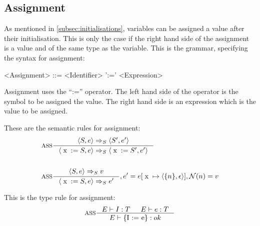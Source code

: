 \subsection{Assignment}\label{subsec:assignment}
As mentioned in \cref{subsec:initialisations}, variables can be assigned a value after their initialisation. This is only the case if the right hand side of the assignment is a value and of the same type as the variable.
This is the grammar, specifying the syntax for assignment:
\begin{grammar}
<Assignment> ::= <Identifier>  ':=' <Expression>
\end{grammar}
Assignment uses the \enquote{:=} operator. The left hand side of the operator is the symbol to be assigned the value. The right hand side is an expression which is the value to be assigned.

These are the semantic rules for assignment:
\begin{align*}
&\inference[ASS]{\Braket{S,e} \Rightarrow_S \Braket{S',e'}}
                 {\Braket{\Tx := S,e} \Rightarrow_S \Braket{\Tx := S',e'}}
\\\\
&\inference[ASS]{\Braket{S,e} \Rightarrow_S v}
                 {\Braket{\Tx := S,e} \Rightarrow_S e'}
								 {, e' = e[\Tx \mapsto \Braket{\{n\},\epsilon}], \mathcal{N}(n) = v}
\end{align*}

This is the type rule for assignment:
\begin{align*}
&\inference[ASS]{\Tenv I : T & \Tenv e: T}
                 {\Tenv \text{\{I := e\}} : ok}
\\\\
\end{align*}
